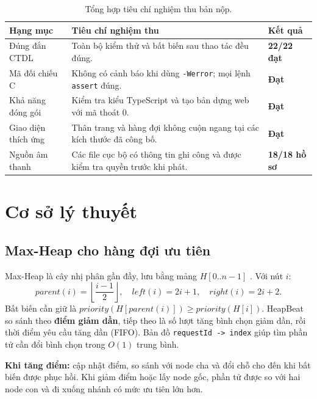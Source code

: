 \documentclass[12pt,a4paper,twoside,openright]{report}
\newcommand{\code}[1]{\texttt{#1}}
\newcommand{\status}[1]{\textcolor{hbgreen}{\sffamily\bfseries #1}}
\begin{document}
\vspace{0.2cm}
\begin{table}[H]\centering\small
\begin{tabularx}{\textwidth}{@{}p{3.25cm}Xp{3.15cm}@{}}
\toprule
\textbf{Hạng mục} & \textbf{Tiêu chí nghiệm thu} & \textbf{Kết quả}\\
\midrule
Đúng đắn CTDL & Toàn bộ kiểm thử và bất biến sau thao tác đều đúng. & \status{22/22 đạt}\\
Mã đối chiếu C & Không có cảnh báo khi dùng \code{-Werror}; mọi lệnh \code{assert} đúng. &
\status{Đạt}\\
Khả năng đóng gói & Kiểm tra kiểu TypeScript và tạo bản dựng web với mã thoát 0. &
\status{Đạt}\\
Giao diện thích ứng & Thân trang và hàng đợi không cuộn ngang tại các kích thước đã công bố.
& \status{Đạt}\\
Nguồn âm thanh & Các file cục bộ có thông tin ghi công và được kiểm tra quyền trước khi phát.
& \status{18/18 hồ sơ}\\
\bottomrule
\end{tabularx}
\caption{Tổng hợp tiêu chí nghiệm thu bản nộp.}
\label{tab:acceptance-dashboard}
\end{table}

\newpage

\chapter{Cơ sở lý thuyết}
\section{Max-Heap cho hàng đợi ưu tiên}
Max-Heap là cây nhị phân gần đầy, lưu bằng mảng $H[0..n-1]$ \cite{cormen2022}.
Với nút $i$:
\[
parent(i)=\left\lfloor\frac{i-1}{2}\right\rfloor,\quad
left(i)=2i+1,\quad right(i)=2i+2.
\]
Bất biến cần giữ là $priority(H[parent(i)]) \ge priority(H[i])$. HeapBeat so sánh
theo \textbf{điểm giảm dần}, tiếp theo là số lượt tăng bình chọn giảm dần, rồi thời điểm yêu
cầu tăng dần (FIFO). Bản đồ \code{requestId -> index} giúp tìm phần tử cần đổi bình chọn
trong $O(1)$ trung bình.

\begin{center}
\qquad
\begin{minipage}[b]{0.46\textwidth}
\small
\textbf{Khi tăng điểm:} cập nhật điểm, so sánh với node cha và đổi chỗ cho đến khi bất
biến được phục hồi. Khi giảm điểm hoặc lấy node gốc, phần tử được so với hai node con và
đi xuống nhánh có mức ưu tiên lớn hơn.
\end{minipage}
\end{center}
\end{document}
